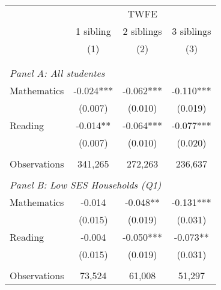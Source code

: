 \makeatletter
{}
{
\makeatother
\begin{tabular}{lccc}
\toprule
\cmidrule(lr){2-4}
& \multicolumn{3}{c}{TWFE} \\
\cmidrule(lr){2-4}
& 1 sibling & 2 siblings & 3 siblings  \\
\cmidrule(lr){2-2} \cmidrule(lr){3-3} \cmidrule(lr){4-4}
& (1) & (2) & (3)\\
\bottomrule
&  &  &  \\
&  &  &   \\
\multicolumn{4}{l}{\textit{Panel A: All studentes}} \\
\hspace{3mm}Mathematics&      -0.024***&      -0.062***&      -0.110***\\
                    &     (0.007)   &     (0.010)   &     (0.019)   \\
 
\hspace{3mm}Reading &      -0.014** &      -0.064***&      -0.077***\\
                    &     (0.007)   &     (0.010)   &     (0.020)   \\
                    &               &               &               \\
\hspace{3mm}Observations&     341,265   &     272,263   &     236,637   \\
 
&  &  &   \\
\multicolumn{4}{l}{\textit{Panel B: Low SES Households (Q1)}} \\
\hspace{3mm}Mathematics&      -0.014   &      -0.048** &      -0.131***\\
                    &     (0.015)   &     (0.019)   &     (0.031)   \\
 
\hspace{3mm}Reading &      -0.004   &      -0.050***&      -0.073** \\
                    &     (0.015)   &     (0.019)   &     (0.031)   \\
                    &               &               &               \\
\hspace{3mm}Observations&      73,524   &      61,008   &      51,297   \\
 

\end{tabular}}
